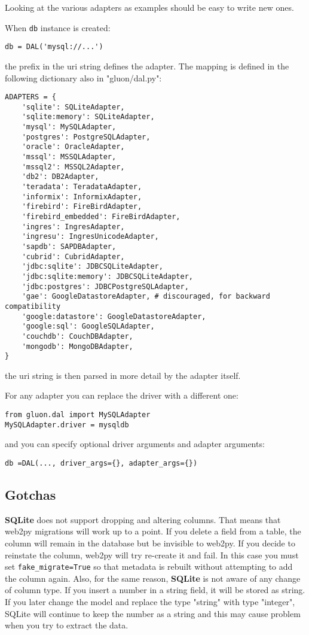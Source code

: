 \documentclass[justified,sixbynine,notoc]{tufte-book}
\def\ft{\small\tt}
\begin{document}
\begin{fullwidth}
Looking at the various adapters as examples should be easy to write new ones.

When {\ft db} instance is created:

\begin{lstlisting}
db = DAL('mysql://...')
\end{lstlisting}
\noindent the prefix in the uri string defines the adapter. The mapping is defined in the following dictionary also in "gluon/dal.py":

\begin{lstlisting}
ADAPTERS = {
    'sqlite': SQLiteAdapter,
    'sqlite:memory': SQLiteAdapter,
    'mysql': MySQLAdapter,
    'postgres': PostgreSQLAdapter,
    'oracle': OracleAdapter,
    'mssql': MSSQLAdapter,
    'mssql2': MSSQL2Adapter,
    'db2': DB2Adapter,
    'teradata': TeradataAdapter,
    'informix': InformixAdapter,
    'firebird': FireBirdAdapter,
    'firebird_embedded': FireBirdAdapter,
    'ingres': IngresAdapter,
    'ingresu': IngresUnicodeAdapter,
    'sapdb': SAPDBAdapter,
    'cubrid': CubridAdapter,
    'jdbc:sqlite': JDBCSQLiteAdapter,
    'jdbc:sqlite:memory': JDBCSQLiteAdapter,
    'jdbc:postgres': JDBCPostgreSQLAdapter,
    'gae': GoogleDatastoreAdapter, # discouraged, for backward compatibility
    'google:datastore': GoogleDatastoreAdapter,
    'google:sql': GoogleSQLAdapter,
    'couchdb': CouchDBAdapter,
    'mongodb': MongoDBAdapter,
}
\end{lstlisting}
\noindent the uri string is then parsed in more detail by the adapter itself.

For any adapter you can replace the driver with a different one:

\begin{lstlisting}
from gluon.dal import MySQLAdapter
MySQLAdapter.driver = mysqldb
\end{lstlisting}
\noindent and you can specify optional driver arguments and adapter arguments:

\begin{lstlisting}
db =DAL(..., driver_args={}, adapter_args={})
\end{lstlisting}

\goodbreak\subsection{Gotchas}

{\bf SQLite} does not support dropping and altering columns. That means that web2py migrations will work up to a point. If you delete a field from a table, the column will remain in the database but be invisible to web2py. If you decide to reinstate the column, web2py will try re-create it and fail. In this case you must set {\ft fake\_migrate=True} so that metadata is rebuilt without attempting to add the column again. Also, for the same reason, {\bf SQLite} is not aware of any change of column type. If you insert a number in a string field, it will be stored as string. If you later change the model and replace the type "string" with type "integer", SQLite will continue to keep the number as a string and this may cause problem when you try to extract the data.


\end{fullwidth}
\end{document}
